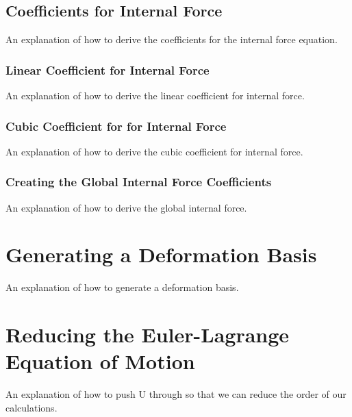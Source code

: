 \documentclass[twocolumn,10pt]{asme2ej}
\begin{document}
\subsection{Coefficients for Internal Force}

An explanation of how to derive the coefficients for the internal force equation.

\subsubsection{Linear Coefficient for Internal Force}

An explanation of how to derive the linear coefficient for internal force.

\subsubsection{Cubic Coefficient for for Internal Force}

An explanation of how to derive the cubic coefficient for internal force.

\subsubsection{Creating the Global Internal Force Coefficients}

An explanation of how to derive the global internal force.

\section{Generating a Deformation Basis}

An explanation of how to generate a deformation basis.

\section{Reducing the Euler-Lagrange Equation of Motion}

An explanation of how to push U through so that we can reduce the order of our calculations.

\end{document}
